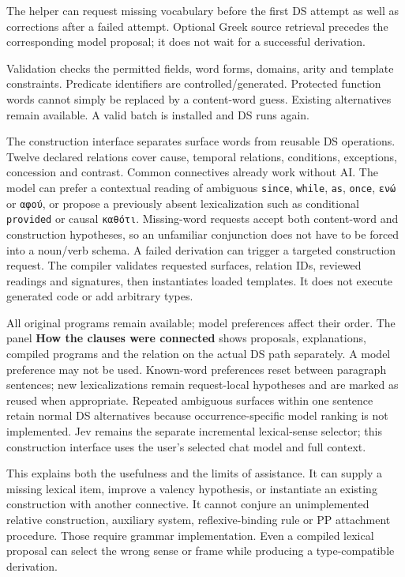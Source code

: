 \documentclass[11pt,a4paper]{article}
\begin{document}
The helper can request missing vocabulary before the first DS attempt as
well as corrections after a failed attempt. Optional Greek source
retrieval precedes the corresponding model proposal; it does not wait
for a successful derivation.

Validation checks the permitted fields, word forms, domains, arity and
template constraints. Predicate identifiers are controlled/generated.
Protected function words cannot simply be replaced by a content-word
guess. Existing alternatives remain available. A valid batch is
installed and DS runs again.

The construction interface separates surface words from reusable DS
operations. Twelve declared relations cover cause, temporal relations,
conditions, exceptions, concession and contrast. Common connectives
already work without AI. The model can prefer a contextual reading of
ambiguous \texttt{since}, \texttt{while}, \texttt{as}, \texttt{once},
\texttt{ενώ} or \texttt{αφού}, or propose a previously absent
lexicalization such as conditional \texttt{provided} or causal
\texttt{καθότι}. Missing-word requests accept both content-word and
construction hypotheses, so an unfamiliar conjunction does not have to
be forced into a noun/verb schema. A failed derivation can trigger a
targeted construction request. The compiler validates requested
surfaces, relation IDs, reviewed readings and signatures, then
instantiates loaded templates. It does not execute generated code or add
arbitrary types.

All original programs remain available; model preferences affect their
order. The panel \textbf{How the clauses were connected} shows
proposals, explanations, compiled programs and the relation on the
actual DS path separately. A model preference may not be used.
Known-word preferences reset between paragraph sentences; new
lexicalizations remain request-local hypotheses and are marked as reused
when appropriate. Repeated ambiguous surfaces within one sentence retain
normal DS alternatives because occurrence-specific model ranking is not
implemented. Jev remains the separate incremental lexical-sense
selector; this construction interface uses the user's selected chat
model and full context.

This explains both the usefulness and the limits of assistance. It can
supply a missing lexical item, improve a valency hypothesis, or
instantiate an existing construction with another connective. It cannot
conjure an unimplemented relative construction, auxiliary system,
reflexive-binding rule or PP attachment procedure. Those require grammar
implementation. Even a compiled lexical proposal can select the wrong
sense or frame while producing a type-compatible derivation.
\end{document}
